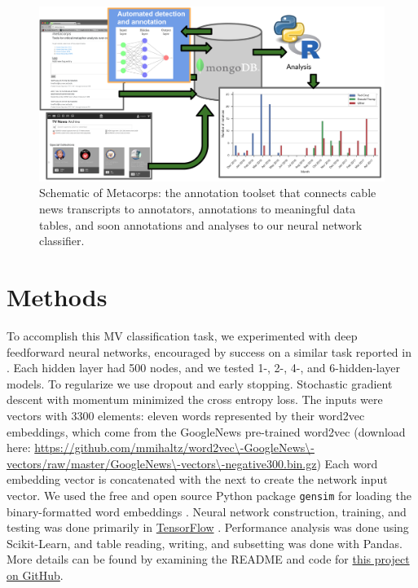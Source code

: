 \documentclass[11pt,letterpaper]{article}
\begin{document}
\begin{figure}
  \centering
  \includegraphics[width=.9\textwidth]{Figures/metacorps-schematic}
\caption{Schematic of Metacorps: the annotation toolset that connects 
  cable news transcripts to annotators, annotations to meaningful data tables, 
  and soon annotations and analyses to our neural network classifier.}
\label{fig:metacorps}
\end{figure}


\section{Methods}\label{methods}

To accomplish this MV classification task, we experimented with deep
feedforward neural networks, encouraged by success on a similar task reported in
\cite{DoDinh2016}. Each hidden layer had 500 nodes, and we
tested 1-, 2-, 4-, and 6-hidden-layer models. To regularize we use
dropout and early stopping. Stochastic gradient descent with momentum
minimized the cross entropy loss. The inputs were vectors with 3300
elements: eleven words represented by their word2vec embeddings, which
come from the GoogleNews pre-trained word2vec (download here:
\url{https://github.com/mmihaltz/word2vec\-GoogleNews\-vectors/raw/master/GoogleNews\-vectors\-negative300.bin.gz})
Each word embedding vector is concatenated with the next to create the
network input vector. We used the free and open source Python package 
\texttt{gensim} for loading the binary-formatted word embeddings \cite{Rehurek2010}.
Neural network construction, training, and testing was done primarily in
\href{https://www.tensorflow.org/}{TensorFlow} \cite{}. Performance 
analysis was done using Scikit-Learn, and table reading, writing, and 
subsetting was done with Pandas. More details can be found by examining the
README and code for 
\href{https://github.com/mtpain/math292-fall17-project}{this project on GitHub}.
\end{document}
